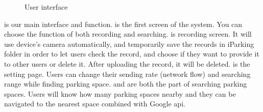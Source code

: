 \documentclass[runningheads,a4paper]{llncs}
\begin{document}
\begin{CJK}{UTF8}{bsmi}
\begin{figure}
{		\label{fig:userSetting}
	}
	\hspace{0.1in}
	\hspace{0.1in}
	\caption{User interface}
	\label{fig:userInterface}
\end{figure}

 is our main interface and function.
 is the first screen of the system. You
can choose the function of both recording and searching.
 is recording screen. It will use device's
camera automatically, and temporarily save the records in iParking
folder in order to let users check the
record, and choose if they want to provide it to other users or delete it. After
uploading the record, it will be deleted. 
is the setting page. Users can change their sending rate (network flow)
and searching range while finding parking space.
 and  are both the part of searching
parking spaces. Users will know how many parking spaces nearby and
they can be navigated to the nearest space combined with Google api.


\end{CJK}
\end{document}
